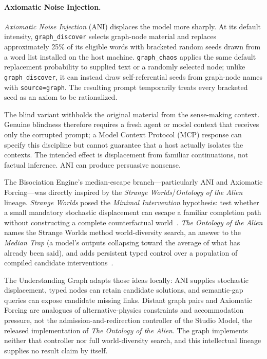 \paragraph{Axiomatic Noise Injection.}
\emph{Axiomatic Noise Injection} (ANI) displaces the model more sharply. At its default intensity, \texttt{graph\_discover} selects graph-node material and replaces approximately 25\% of its eligible words with bracketed random seeds drawn from a word list installed on the host machine. \texttt{graph\_chaos} applies the same default replacement probability to supplied text or a randomly selected node; unlike \texttt{graph\_discover}, it can instead draw self-referential seeds from graph-node names with \texttt{source=graph}. The resulting prompt temporarily treats every bracketed seed as an axiom to be rationalized.

The blind variant withholds the original material from the sense-making context. Genuine blindness therefore requires a fresh agent or model context that receives only the corrupted prompt; a Model Context Protocol (MCP) response can specify this discipline but cannot guarantee that a host actually isolates the contexts. The intended effect is displacement from familiar continuations, not factual inference. ANI can produce persuasive nonsense.

The Bisociation Engine's median-escape branch---particularly ANI and Axiomatic Forcing---was directly inspired by the \emph{Strange Worlds}/\emph{Ontology of the Alien} lineage. \emph{Strange Worlds} posed the \emph{Minimal Intervention} hypothesis: test whether a small mandatory stochastic displacement can escape a familiar completion path without constructing a complete counterfactual world~\cite{westerberg2025strangeworlds}. \emph{The Ontology of the Alien} names the Strange Worlds method world-diversity search, an answer to the \emph{Median Trap} (a model's outputs collapsing toward the average of what has already been said), and adds persistent typed control over a population of compiled candidate interventions~\cite{westerberg2026alien}.

The Understanding Graph adapts those ideas locally: ANI supplies stochastic displacement, typed nodes can retain candidate solutions, and semantic-gap queries can expose candidate missing links. Distant graph pairs and Axiomatic Forcing are analogues of alternative-physics constraints and accommodation pressure, not the admission-and-redirection controller of the Studio Model, the released implementation of \emph{The Ontology of the Alien}. The graph implements neither that controller nor full world-diversity search, and this intellectual lineage supplies no result claim by itself.

